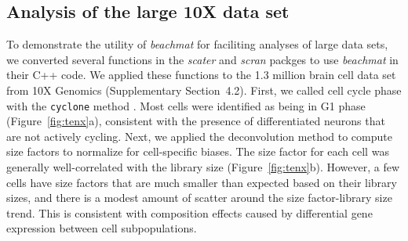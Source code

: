 \documentclass[10pt,letterpaper]{article}
\newcommand{\suppsecrealtenx}{4.2}
\newcommand{\beachmat}{\textit{beachmat}}
\newcommand{\code}[1]{\texttt{#1}}
\begin{document}
\subsection*{Analysis of the large 10X data set}
To demonstrate the utility of \beachmat{} for faciliting analyses of large data sets, we converted several functions in the \textit{scater} \cite{mccarthy2017scater} and \textit{scran} packges \cite{lun2016stepbystep} to use \beachmat{} in their C++ code.
We applied these functions to the 1.3 million brain cell data set from 10X Genomics (Supplementary Section~\suppsecrealtenx{}).
First, we called cell cycle phase with the \code{cyclone} method \cite{scialdone2015computational}. 
Most cells were identified as being in G1 phase (Figure~\ref{fig:tenx}a), consistent with the presence of differentiated neurons that are not actively cycling.
Next, we applied the deconvolution method \cite{lun2016pooling} to compute size factors to normalize for cell-specific biases.
The size factor for each cell was generally well-correlated with the library size (Figure~\ref{fig:tenx}b).
However, a few cells have size factors that are much smaller than expected based on their library sizes, and there is a modest amount of scatter around the size factor-library size trend.
This is consistent with composition effects \cite{robinson2010scaling} caused by differential gene expression between cell subpopulations.
\end{document}

